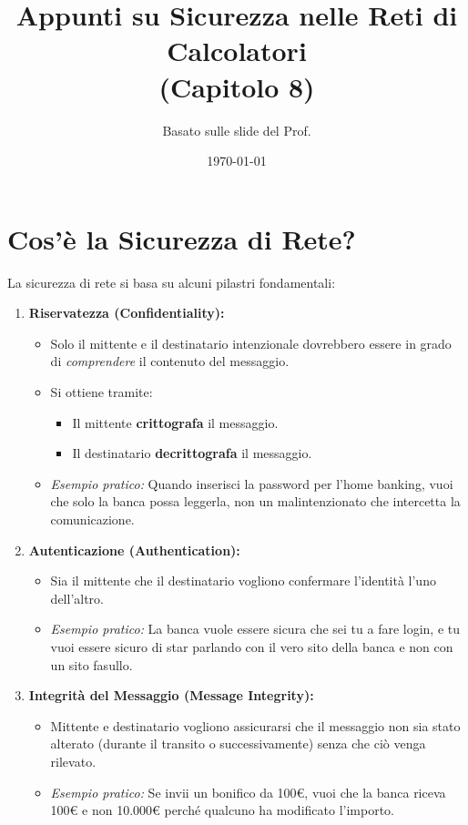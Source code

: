 \documentclass{article}
\title{Appunti su Sicurezza nelle Reti di Calcolatori \\ (Capitolo 8)}
\author{Basato sulle slide del Prof.} %
\date{\today}
\begin{document}
\maketitle
\tableofcontents
\newpage

\section{Cos'è la Sicurezza di Rete?}
\label{sec:cos_e_sicurezza}

La sicurezza di rete si basa su alcuni pilastri fondamentali:

\begin{enumerate}[label=\arabic*.]
    \item \textbf{Riservatezza (Confidentiality):}
    \begin{itemize}
        \item Solo il mittente e il destinatario intenzionale dovrebbero essere in grado di \textit{comprendere} il contenuto del messaggio.
        \item Si ottiene tramite:
        \begin{itemize}
            \item Il mittente \textbf{crittografa} il messaggio.
            \item Il destinatario \textbf{decrittografa} il messaggio.
        \end{itemize}
        \item \textit{Esempio pratico:} Quando inserisci la password per l'home banking, vuoi che solo la banca possa leggerla, non un malintenzionato che intercetta la comunicazione.
    \end{itemize}

    \item \textbf{Autenticazione (Authentication):}
    \begin{itemize}
        \item Sia il mittente che il destinatario vogliono confermare l'identità l'uno dell'altro.
        \item \textit{Esempio pratico:} La banca vuole essere sicura che sei tu a fare login, e tu vuoi essere sicuro di star parlando con il vero sito della banca e non con un sito fasullo.
    \end{itemize}

    \item \textbf{Integrità del Messaggio (Message Integrity):}
    \begin{itemize}
        \item Mittente e destinatario vogliono assicurarsi che il messaggio non sia stato alterato (durante il transito o successivamente) senza che ciò venga rilevato.
        \item \textit{Esempio pratico:} Se invii un bonifico da 100€, vuoi che la banca riceva 100€ e non 10.000€ perché qualcuno ha modificato l'importo.
    \end{itemize}


\end{enumerate}
\end{document}
